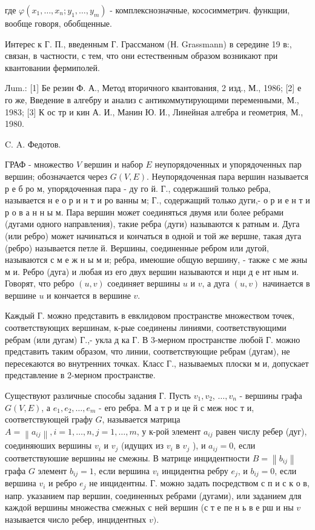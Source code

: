 \documentclass[10pt]{article}
\begin{document}
где $\varphi\left(x_{1}, \ldots, x_{n} ; y_{1}, \ldots, y_{m}\right)$ - комплекснозначные, кососимметрич. функщии, вообще говоря, обобщенные.



Интерес к Г. П., введенным Г. Грассманом (Н. Grassmann) в середине 19 в:, связан, в частности, с тем, что они естественным образом возникают при квантовании фермиполей.



Лum.: [1] Бе резин Ф. А., Метод вторичного квантования, 2 изд., М., 1986; [2] е го же, Введение в алгебру и анализ с антикоммутирующими переменными, М., 1983; [3] К ос тр и кин А. И., Манин Ю. И., Линейная алгебра и геометрия, М., 1980.



C. A. Федотов.



ГРАФ - множество $V$ вершин и набор $E$ неупорядоченных и упорядоченных пар вершин; обозначается через $G(V, E)$. Неупорядоченная пара вершин называется р е б ро м, упорядоченная пара - ду го й. Г., содержаший только ребра, называется н е о р и н т и ро ванны м; Г., содержащий только дуги,- о р и е н т и р о в а н н ы м. Пара вершин может соединяться двумя или более ребрами (дугами одного направления), такие ребра (дуги) называются к ратным и. Дуга (или ребро) может начинаться и кончаться в одной и той же вершне, такая дуга (ребро) называется петле й. Вершины, соединенные ребром или дугой, называются с м е ж н ы м и; ребра, имеюшие общую вершину, - также с ме жны м и. Ребро (дуга) и любая из его двух вершин называются и нци д е нт ным и. Говорят, что ребро $(u, v)$ соединяет вершины $u$ и $v$, а дуга $(u, v)$ начинается в вершине $u$ и кончается в вершине $v$.



Каждый Г. можно представить в евклидовом пространстве множеством точек, соответствующих вершинам, к-рые соединены линиями, соответствующими ребрам (или дугам) Г.,- укла д ка Г. В 3-мерном пространстве любой Г. можно представить таким образом, что линии, соответствующие ребрам (дугам), не пересекаются во внутренних точках. Класс Г., называемых плоски м и, допускает представление в 2-мерном пространстве.



Существуют различные способы задания Г. Пусть $v_{1}, v_{2}$, $\ldots, v_{n}$ - вершины графа $G(V, E)$, а $e_{1}, e_{2}, \ldots, e_{m}$ - его ребра. М а т р и це й с меж нос т и, соответствующей графу $G$, называется матрица $A=\left\|a_{i j}\right\|, i=1, \ldots, n, j=1, \ldots, m$, у к-рой элемент $a_{i j}$ равен числу ребер (дуг), соединяюших вершины $v_{i}$ и $v_{j}$ (идущих из $v_{i}$ в $v_{j}$ ), и $a_{i j}=0$, если соответствуюшие вершины не смежны. В матрице инцидентности $B=\left\|b_{i j}\right\|$ графа $G$ элемент $b_{i j}=1$, если вершина $v_{i}$ инцидентна ребру $e_{j}$, и $b_{i j}=0$, если вершина $v_{i}$ и ребро $e_{j}$ не инцидентны. Г. можно задать посредством с п и с к о в, напр. указанием пар вершин, соединенных ребрами (дугами), или заданием для каждой вершины множества смежных с ней вершин (с т е пе н ь в е рш и ны $v$ называется число ребер, инцидентных $v)$.
\end{document}
